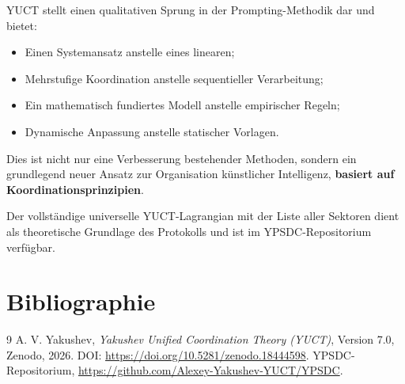 \documentclass[11pt,a4paper]{article}
\begin{document}
	YUCT stellt einen qualitativen Sprung in der Prompting-Methodik dar und bietet:
	\begin{itemize}
		\item Einen Systemansatz anstelle eines linearen;
		\item Mehrstufige Koordination anstelle sequentieller Verarbeitung;
		\item Ein mathematisch fundiertes Modell anstelle empirischer Regeln;
		\item Dynamische Anpassung anstelle statischer Vorlagen.
	\end{itemize}
	
	Dies ist nicht nur eine Verbesserung bestehender Methoden, sondern ein grundlegend neuer Ansatz zur Organisation künstlicher Intelligenz, \textbf{basiert auf Koordinationsprinzipien}.
	
	Der vollständige universelle YUCT-Lagrangian mit der Liste aller Sektoren dient als theoretische Grundlage des Protokolls und ist im YPSDC-Repositorium verfügbar.
	
	\section*{Bibliographie}
	\begin{thebibliography}{9}
		A. V. Yakushev, \emph{Yakushev Unified Coordination Theory (YUCT)}, Version 7.0, Zenodo, 2026. DOI: \url{https://doi.org/10.5281/zenodo.18444598}.
		YPSDC-Repositorium, \url{https://github.com/Alexey-Yakushev-YUCT/YPSDC}.
	\end{thebibliography}
	
\end{document}
